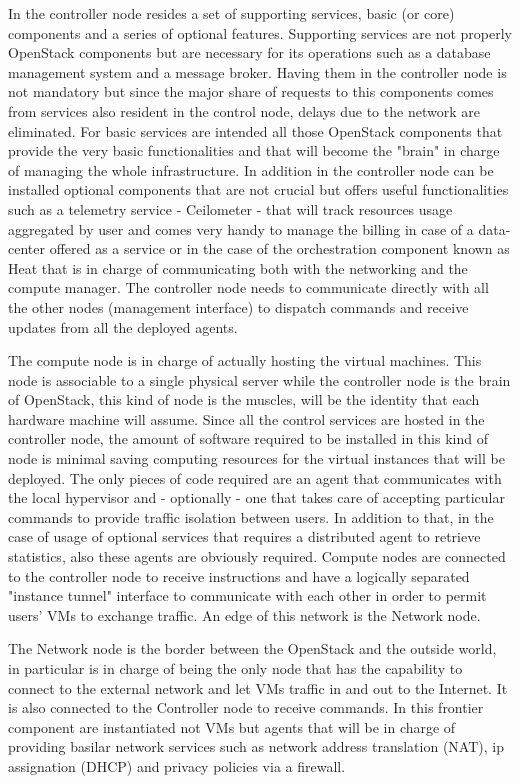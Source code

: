 In the controller node resides a set of supporting services, basic (or core) components and a series of optional features.
Supporting services are not properly OpenStack components but are necessary for its operations such as a database management system and a message broker. Having them in the controller node is not mandatory but since the major share of requests to this components comes from services also resident in the control node, delays due to the network are eliminated.
For basic services are intended all those OpenStack components that provide the very basic functionalities and that will become the "brain" in charge of managing the whole infrastructure.
In addition in the controller node can be installed optional components that are not crucial but offers useful functionalities such as a telemetry service - Ceilometer - that will track resources usage aggregated by user and comes very handy to manage the billing in case of a data-center offered as a service or in the case of the orchestration component known as Heat that is in charge of communicating both with the networking and the compute manager. The controller node needs to communicate directly with all the other nodes (management interface) to dispatch commands and receive updates from all the deployed agents.

The compute node is in charge of actually hosting the virtual machines. This node is associable to a single physical server while the controller node is the brain of OpenStack, this kind of node is the muscles, will be the identity that each hardware machine will assume. Since all the control services are hosted in the controller node, the amount of software required to be installed in this kind of node is minimal saving computing resources for the virtual instances that will be deployed. The only pieces of code required are an agent that communicates with the local hypervisor and - optionally - one that takes care of accepting particular commands to provide traffic isolation between users. In addition to that, in the case of usage of optional services that requires a distributed agent to retrieve statistics, also these agents are obviously required.
Compute nodes are connected to the controller node to receive instructions and have a logically separated "instance tunnel" interface to communicate with each other in order to permit users' VMs to exchange traffic. An edge of this network is the Network node.

The Network node is the border between the OpenStack and the outside world, in particular is in charge of being the only node that has the capability to connect to the external network and let VMs traffic in and out to the Internet. It is also connected to the Controller node to receive commands. In this frontier component are instantiated not VMs but agents that will be in charge of providing basilar network services such as network address translation (NAT), ip assignation (DHCP) and privacy policies via a firewall.

